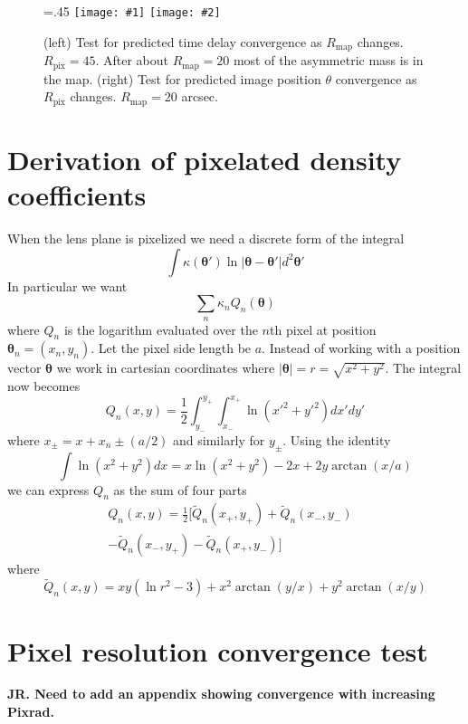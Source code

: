 \documentclass[galley,usenatbib]{mn2e}
\newcommand{\Rmap}{\ensuremath{R_\mathrm{map}}}
\newcommand{\Rpix}{\ensuremath{R_\mathrm{pix}}}
\renewcommand{\vec}[1]{\ensuremath{\boldsymbol{#1}}}
\newcommand\plottwo[2]{{%
 \centering
 \leavevmode
 \columnwidth=.45\columnwidth
 \texttt{[image: \#1]}%
 \hfil
 \texttt{[image: \#2]}%
}}%
\begin{document}
\begin{figure}
\plottwo{tdconv_pr45.pdf}{imgpos_conv_mr20.pdf}
\caption{(left) Test for predicted time delay convergence as $\Rmap$ changes.
$\Rpix=45$. After about $\Rmap=20$ most of the asymmetric mass is in the map.
(right) Test for predicted image position $\theta$ convergence as $\Rpix$
changes. $\Rmap=20$ arcsec.}
\label{raytracing convergence tests}
\end{figure}

\section{Derivation of pixelated density coefficients}
\label{Q derivation}
When the lens plane is pixelized we need a discrete form of the integral
%
\[\int \kappa(\vec\theta') \ln |\vec\theta-\vec\theta'| d^2\vec\theta' \]
%
In particular we want
%
\[\sum_n \kappa_n Q_n(\vec\theta)\]
%
where $Q_n$ is the logarithm evaluated over the $n$th pixel at position $\vec\theta_n = (x_n, y_n)$. Let the pixel side length be $a$.
Instead of working with a position vector $\vec\theta$ we work in cartesian coordinates where 
%
$|\vec\theta| = r = \sqrt{x^2 + y^2}$. The integral now becomes
%
\[Q_n(x,y) = \frac12 \int_{y_-}^{y_+}\int_{x_-}^{x_+} \ln (x'^2+y'^2) dx' dy'\]
%
where $x_\pm = x + x_n \pm (a/2)$ and similarly for $y_\pm$.
Using the identity
%
\[\int \ln(x^2+y^2) dx = x \ln(x^2+y^2) - 2x + 2y\arctan(x/a) \]
%
we can express $Q_n$ as the sum of four parts
%
\begin{align*}
Q_n(x,y) = \frac12 [\tilde Q_n(x_+,y_+)
                  + \tilde Q_n(x_-,y_-) & 
\\                - \tilde Q_n(x_-,y_+)
                  - \tilde Q_n(x_+,y_-) ]
\end{align*}
%
where
%
\[\tilde Q_n(x,y) = xy(\ln r^2 - 3) + x^2\arctan(y/x) + y^2\arctan(x/y)\]

\section{Pixel resolution convergence test}
{\bf JR. Need to add an appendix showing convergence with increasing Pixrad.} 



\end{document}
